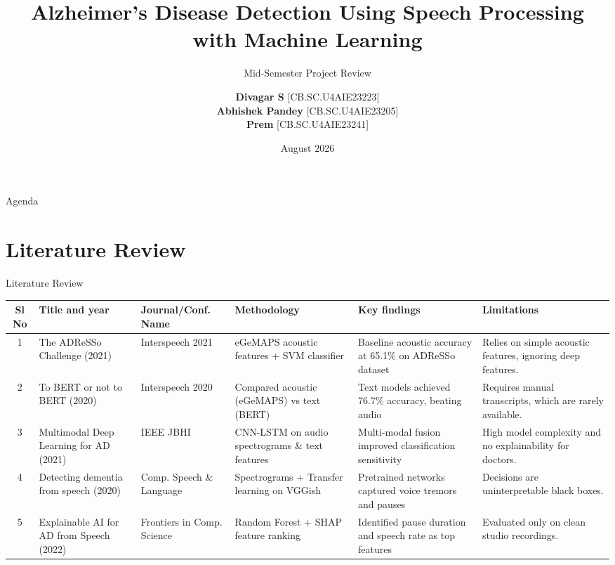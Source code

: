 \documentclass[aspectratio=169]{beamer}
\title[Alzheimer's Detection via Speech Processing]{Alzheimer's Disease Detection Using Speech Processing with Machine Learning}
\subtitle{Mid-Semester Project Review}
\author[Divagar, Abhishek, Prem]{
    \textbf{Divagar S} [CB.SC.U4AIE23223] \\
    \textbf{Abhishek Pandey} [CB.SC.U4AIE23205] \\
    \textbf{Prem} [CB.SC.U4AIE23241]
}
\institute[Amrita Vishwa Vidyapeetham]{22AIE450 Speech Processing \\ Department of AI \& Data Science}
\date{August 2026}
\begin{document}
\begin{frame}
    \titlepage
\end{frame}

\begin{frame}{Agenda}
    \tableofcontents
\end{frame}

\section{Literature Review}
\begin{frame}{Literature Review}
    \begin{table}
    \centering
    \tiny
    \begin{tabular}{cp{2.0cm}p{1.8cm}p{2.2cm}p{2.6cm}p{2.4cm}}
        \toprule
        \textbf{Sl No} & \textbf{Title and year} & \textbf{Journal/Conf. Name} & \textbf{Methodology} & \textbf{Key findings} & \textbf{Limitations} \\
        \midrule
        1 & The ADReSSo Challenge (2021) & Interspeech 2021 & eGeMAPS acoustic features + SVM classifier & Baseline acoustic accuracy at 65.1\% on ADReSSo dataset & Relies on simple acoustic features, ignoring deep features. \\
        \midrule
        2 & To BERT or not to BERT (2020) & Interspeech 2020 & Compared acoustic (eGeMAPS) vs text (BERT) & Text models achieved 76.7\% accuracy, beating audio & Requires manual transcripts, which are rarely available. \\
        \midrule
        3 & Multimodal Deep Learning for AD (2021) & IEEE JBHI & CNN-LSTM on audio spectrograms \& text features & Multi-modal fusion improved classification sensitivity & High model complexity and no explainability for doctors. \\
        \midrule
        4 & Detecting dementia from speech (2020) & Comp. Speech \& Language & Spectrograms + Transfer learning on VGGish & Pretrained networks captured voice tremors and pauses & Decisions are uninterpretable black boxes. \\
        \midrule
        5 & Explainable AI for AD from Speech (2022) & Frontiers in Comp. Science & Random Forest + SHAP feature ranking & Identified pause duration and speech rate as top features & Evaluated only on clean studio recordings. \\
        \bottomrule
    \end{tabular}
    \end{table}
\end{frame}
\end{document}
